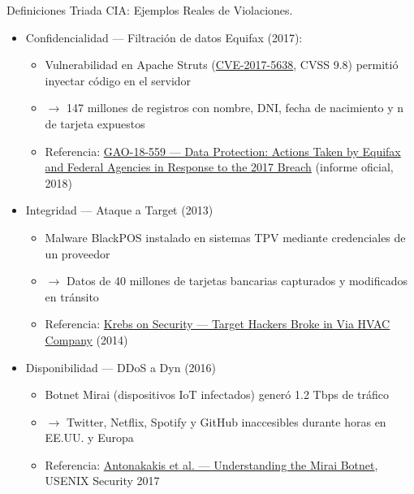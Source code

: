 \documentclass[aspectratio=169,11pt]{beamer}
\begin{document}
\begin{frame}{Definiciones}
\scriptsize
  Triada CIA: Ejemplos Reales de Violaciones.
\begin{itemize}
  \item Confidencialidad --- Filtración de datos Equifax (2017):
\begin{itemize}
  \item Vulnerabilidad en Apache Struts (\href{https://nvd.nist.gov/vuln/detail/CVE-2017-5638}{CVE-2017-5638}, CVSS 9.8) permitió inyectar código en el servidor
  \item $\rightarrow$ 147 millones de registros con nombre, DNI, fecha de nacimiento y n de tarjeta expuestos
  \item Referencia: \href{https://www.gao.gov/products/gao-18-559}{GAO-18-559 --- Data Protection: Actions Taken by Equifax and Federal Agencies in Response to the 2017 Breach} (informe oficial, 2018)
  \end{itemize}
  \item Integridad --- Ataque a Target (2013)
\begin{itemize}
  \item Malware BlackPOS instalado en sistemas TPV mediante credenciales de un proveedor
  \item $\rightarrow$ Datos de 40 millones de tarjetas bancarias capturados y modificados en tránsito
  \item Referencia: \href{https://krebsonsecurity.com/2014/02/target-hackers-broke-in-via-hvac-company/}{Krebs on Security --- Target Hackers Broke in Via HVAC Company} (2014)
  \end{itemize}
  \item Disponibilidad --- DDoS a Dyn (2016)
  \begin{itemize}
  \item Botnet Mirai (dispositivos IoT infectados) generó 1.2 Tbps de tráfico
  \item $\rightarrow$ Twitter, Netflix, Spotify y GitHub inaccesibles durante horas en EE.UU. y Europa
  \item Referencia: \href{https://www.usenix.org/conference/usenixsecurity17/technical-sessions/presentation/antonakakis}{Antonakakis et al. --- Understanding the Mirai Botnet}, USENIX Security 2017
  \end{itemize}
  \end{itemize}
\end{frame}
\end{document}
